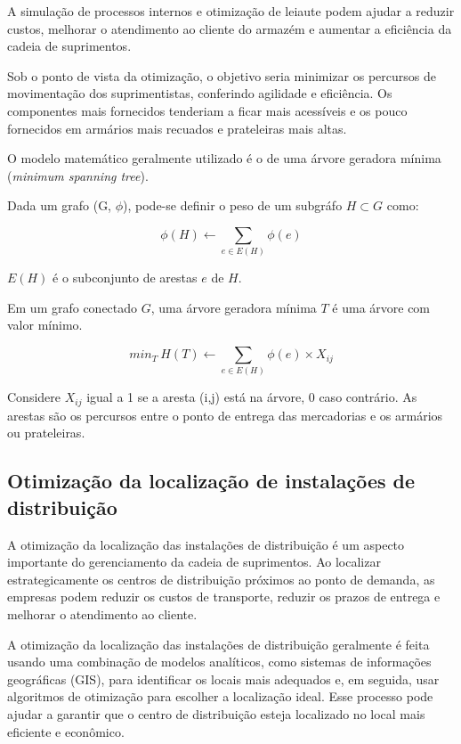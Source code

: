 \documentclass{amsart}
\begin{document}
A simulação de processos internos e otimização de leiaute podem ajudar a reduzir custos, melhorar o atendimento ao cliente do armazém e aumentar a eficiência da cadeia de suprimentos.

Sob o ponto de vista da otimização, o objetivo seria minimizar os percursos de movimentação dos suprimentistas, conferindo agilidade e eficiência. Os componentes mais fornecidos tenderiam a ficar mais acessíveis e os pouco fornecidos em armários mais recuados e prateleiras mais altas.

O modelo matemático geralmente utilizado é o de uma árvore geradora mínima ({\it minimum spanning tree}).

Dada um grafo (G, $\phi$), pode-se definir o peso de um subgráfo $H \subset G$ como:

\begin{equation} \label{eq:fo1}
	\phi(H) \gets \sum_{e \in E(H)} \phi (e)
\end{equation}

$E(H)$ é o subconjunto de arestas $e$ de $H$.

Em um grafo conectado $G$, uma árvore geradora mínima $T$ é uma árvore com valor mínimo.

\begin{equation} \label{eq:fo2}
	min_T\ H(T) \gets \sum_{e \in E(H)} \phi (e) \times X_{ij}
\end{equation}


Considere $X_{ij}$ igual a 1 se a aresta (i,j) está na árvore, 0 caso contrário. As arestas são os percursos entre o ponto de entrega das mercadorias e os armários ou prateleiras.



\subsection{Otimização da localização de instalações de distribuição}

A otimização da localização das instalações de distribuição é um aspecto importante do gerenciamento da cadeia de suprimentos. Ao localizar estrategicamente os centros de distribuição próximos ao ponto de demanda, as empresas podem reduzir os custos de transporte, reduzir os prazos de entrega e melhorar o atendimento ao cliente.

A otimização da localização das instalações de distribuição geralmente é feita usando uma combinação de modelos analíticos, como sistemas de informações geográficas (GIS), para identificar os locais mais adequados e, em seguida, usar algoritmos de otimização para escolher a localização ideal. Esse processo pode ajudar a garantir que o centro de distribuição esteja localizado no local mais eficiente e econômico.
\end{document}
